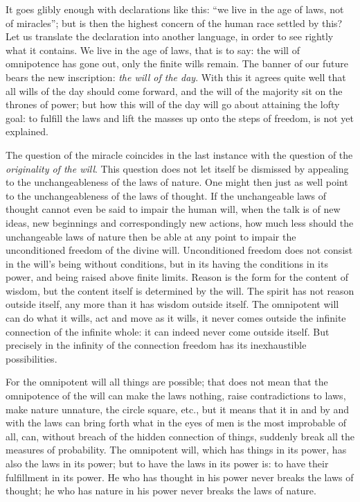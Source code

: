 \documentclass[12pt,a4paper,openany]{book}
\newcommand{\opage}[1]{\marginnote{\footnotesize\textit{[#1]}}}
\begin{document}
\setcounter{footnote}{0}%
\opage{52}It goes glibly enough with declarations like this:
``we live in the age of laws, not of miracles''; but is then
the highest concern of the human race settled by this?
Let us translate the declaration into another language, in order to see
rightly what it contains. We live in the age of laws, that
is to say: the will of omnipotence has gone out, only the finite
wills remain. The banner of our future bears the new
inscription: \emph{the will of the day}. With this it agrees quite
well that all wills of the day should come forward, and the will of the majority
sit on the thrones of power; but how this will of the day
will go about attaining the lofty goal: to fulfill
the laws and lift the masses up onto the steps of freedom, is not yet
explained.

The question of the miracle coincides in the last instance
with the question of the \emph{originality of the will}.
This question does not let itself be dismissed by appealing
to the unchangeableness of the laws of nature. One might then
just as well point to the unchangeableness of the laws of thought.
If the unchangeable laws of thought cannot even be said to
impair the human will, when the talk is of
new ideas, new beginnings and correspondingly new actions,
how much less should the unchangeable laws of nature then be able at
any point to impair the unconditioned freedom
of the divine will. Unconditioned freedom does not consist
in the will's being without conditions, but in its
having the conditions in its power, and being raised above finite
limits. Reason is the form for the content of wisdom,
but the content itself is determined by the will. The spirit has
not reason outside itself, any more than it has wisdom
outside itself. The omnipotent will can do
what it wills, act and move as it wills, it never
comes outside the infinite connection of the infinite whole:
it can indeed never come outside itself. But precisely
in the infinity of the connection freedom has its inexhaustible
possibilities.

For the omnipotent will all things are possible; that
does not mean that the omnipotence of the will can make the laws nothing,
\setcounter{footnote}{0}%
\opage{53}raise contradictions to laws, make nature unnature, the circle
square, etc., but it means that it in and by
and with the laws can bring forth what in the eyes of men is the most improbable of all,
can, without breach of the hidden connection
of things, suddenly break all the measures of probability.
The omnipotent will, which has things in its power,
has also the laws in its power; but to have the laws in its
power is: to have their fulfillment in its power. He who
has thought in his power never breaks the laws of thought;
he who has nature in his power never breaks
the laws of nature.
\end{document}
